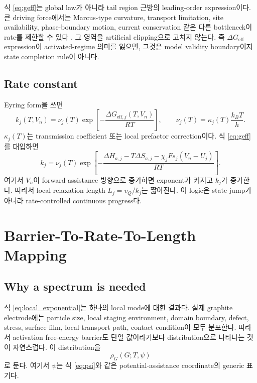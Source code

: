 \documentclass[11pt]{article}
\newcommand{\eff}{\mathrm{eff}}
\begin{document}
식 \eqref{eq:geff}는 global law가 아니라 tail region 근방의 leading-order expression이다.
큰 driving force에서는 Marcus-type curvature, transport limitation, site availability, phase-boundary
motion, current conservation 같은 다른 bottleneck이 rate를 제한할 수 있다 \cite{marcus1956,bardfaulkner}.
그 영역을 artificial clipping으로 고치지 않는다. 즉 \(\Delta G_{\eff}\) expression이 activated-regime
의미를 잃으면, 그것은 model validity boundary이지 state completion rule이 아니다.

\subsection{Rate constant}\label{subsec:rate}

Eyring form을 쓰면
\begin{equation}
\boxed{
k_j(T,V_n)
=
\nu_j(T)
\exp\!\left[
-\frac{\Delta G_{\eff,j}(T,V_n)}{RT}
\right],
\qquad
\nu_j(T)=\kappa_j(T)\frac{k_BT}{h}.
}
\label{eq:rate}
\end{equation}
\(\kappa_j(T)\)는 transmission coefficient 또는 local prefactor correction이다. 식
\eqref{eq:geff}를 대입하면
\begin{equation}
k_j
=
\nu_j(T)
\exp\!\left[
-\frac{\Delta H_{a,j}-T\Delta S_{a,j}-\chi_jF s_j(V_n-U_j)}
{RT}
\right].
\label{eq:rate_explicit}
\end{equation}
여기서 \(V_n\)이 forward assistance 방향으로 증가하면 exponent가 커지고 \(k_j\)가 증가한다.
따라서 local relaxation length \(L_j=v_Q/k_j\)는 짧아진다. 이 logic은 state jump가 아니라
rate-controlled continuous progress다.

\section{Barrier-To-Rate-To-Length Mapping}\label{sec:mapping}

\subsection{Why a spectrum is needed}\label{subsec:why_spectrum}

식 \eqref{eq:local_exponential}는 하나의 local mode에 대한 결과다. 실제 graphite electrode에는
particle size, local staging environment, domain boundary, defect, stress, surface film,
local transport path, contact condition이 모두 분포한다. 따라서 activation free-energy barrier도
단일 값이라기보다 distribution으로 나타나는 것이 자연스럽다. 이 distribution을
\begin{equation}
\rho_G(G;T,\psi)
\label{eq:rho_g}
\end{equation}
로 둔다. 여기서 \(\psi\)는 식 \eqref{eq:psi}와 같은 potential-assistance coordinate의 generic
표기다.
\end{document}
